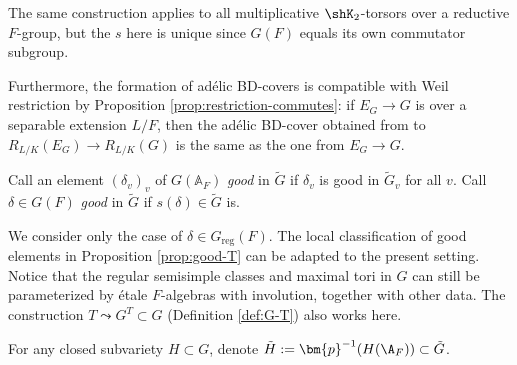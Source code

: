 \documentclass[a4paper,10pt]{article}
\begin{document}
\begin{remark}\label{rem:adelic-Weil-restriction}
	The same construction applies to all multiplicative $\shK_2$-torsors over a reductive $F$-group, but the $s$ here is unique since $G(F)$ equals its own commutator subgroup.
	
	Furthermore, the formation of adélic BD-covers is compatible with Weil restriction by Proposition \ref{prop:restriction-commutes}: if $E_G \to G$ is over a separable extension $L/F$, then the adélic BD-cover obtained from to $R_{L/K}(E_G) \to R_{L/K}(G)$ is the same as the one from $E_G \to G$.
\end{remark}

\begin{definition}
	Call an element $(\delta_v)_v$ of $G(\mathbb{A}_F)$ \emph{good} in $\tilde{G}$ if $\delta_v$ is good in $\tilde{G}_v$ for all $v$. Call $\delta \in G(F)$ \emph{good} in $\tilde{G}$ if $s(\delta) \in \tilde{G}$ is.
\end{definition}

We consider only the case of $\delta \in G_\text{reg}(F)$. The local classification of good elements in Proposition \ref{prop:good-T} can be adapted to the present setting. Notice that the regular semisimple classes and maximal tori in $G$ can still be parameterized by étale $F$-algebras with involution, together with other data. The construction $T \leadsto G^T \subset G$ (Definition \ref{def:G-T}) also works here.

For any closed subvariety $H \subset G$, denote $\tilde{H} := \bm{p}^{-1}(H(\A_F)) \subset \tilde{G}$.
\end{document}
